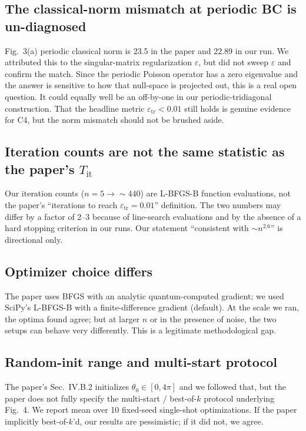 \documentclass[11pt]{article}
\begin{document}
\subsection{The classical-norm mismatch at periodic BC is un-diagnosed}
Fig.~3(a) periodic classical norm is 23.5 in the paper and 22.89 in our run. We
attributed this to the singular-matrix regularization $\varepsilon$, but did not
sweep $\varepsilon$ and confirm the match. Since the periodic Poisson operator has a
zero eigenvalue and the answer is sensitive to how that null-space is projected out,
this is a real open question. It could equally well be an off-by-one in our
periodic-tridiagonal construction. That the headline metric $\varepsilon_{\text{tr}}
< 0.01$ still holds is genuine evidence for C4, but the norm mismatch should not be
brushed aside.

\subsection{Iteration counts are not the same statistic as the paper's $T_{\text{it}}$}
Our iteration counts ($n=5\to\sim\!440$) are L-BFGS-B function evaluations, not the
paper's ``iterations to reach $\varepsilon_{\text{tr}}=0.01$'' definition. The two
numbers may differ by a factor of 2--3 because of line-search evaluations and by the
absence of a hard stopping criterion in our runs. Our statement ``consistent with
$\sim n^{2.6}$'' is directional only.

\subsection{Optimizer choice differs}
The paper uses BFGS with an analytic quantum-computed gradient; we used SciPy's
L-BFGS-B with a finite-difference gradient (default). At the scale we ran, the
optima found agree; but at larger $n$ or in the presence of noise, the two setups
can behave very differently. This is a legitimate methodological gap.

\subsection{Random-init range and multi-start protocol}
The paper's Sec.~IV.B.2 initializes $\theta_0\in[0,4\pi]$ and we followed that,
but the paper does not fully specify the multi-start / best-of-$k$ protocol
underlying Fig.~4. We report mean over 10 fixed-seed single-shot optimizations.
If the paper implicitly best-of-$k$'d, our results are pessimistic; if it did not,
we agree.
\end{document}
